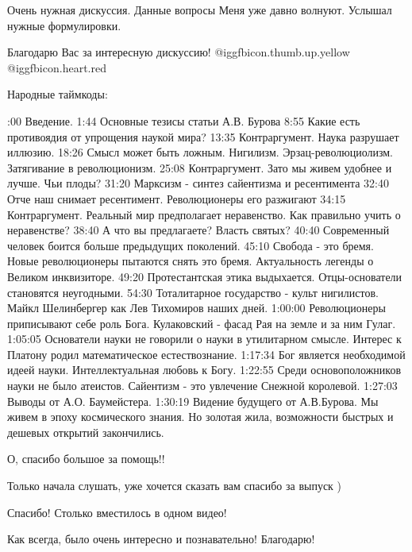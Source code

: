 \begin{multicols}{2} %
\setlength{\parindent}{0pt}


Очень нужная дискуссия.
Данные вопросы Меня уже давно волнуют. Услышал нужные формулировки.

Благодарю Вас  за интересную дискуссию! @igg{fbicon.thumb.up.yellow} @igg{fbicon.heart.red}


Народные таймкоды:

:00 Введение. 
1:44 Основные тезисы статьи А.В. Бурова
8:55 Какие есть противоядия от упрощения наукой мира?
13:35 Контраргумент. Наука разрушает иллюзию.
18:26 Смысл может быть ложным. Нигилизм. Эрзац-революциолизм. Затягивание в революционизм.
25:08 Контраргумент. Зато мы живем удобнее и лучше. Чьи плоды?
31:20 Марксизм - синтез сайентизма и ресентимента
32:40 Отче наш снимает ресентимент. Революционеры его разжигают
34:15 Контраргумент. Реальный мир предполагает неравенство. Как правильно учить о неравенстве?
38:40 А что вы предлагаете? Власть святых? 
40:40 Современный человек боится больше предыдущих поколений.
45:10 Свобода - это бремя. Новые революционеры пытаются снять это бремя. Актуальность легенды о Великом инквизиторе.
49:20 Протестантская этика выдыхается. Отцы-основатели становятся неугодными. 
54:30 Тоталитарное государство - культ нигилистов. Майкл Шелинбергер как Лев Тихомиров наших дней.
1:00:00 Революционеры приписывают себе роль Бога. Кулаковский - фасад Рая на земле и за ним Гулаг. 
1:05:05 Основатели науки не говорили о науки в утилитарном смысле. Интерес к Платону родил математическое естествознание. 
1:17:34 Бог является необходимой идеей науки. Интеллектуальная любовь к Богу. 
1:22:55 Среди основоположников науки не было атеистов. Сайентизм - это увлечение Снежной королевой.
1:27:03 Выводы от А.О. Баумейстера. 
1:30:19 Видение будущего от А.В.Бурова. Мы живем в эпоху космического знания. Но золотая жила, возможности быстрых и дешевых открытий закончились.
\restorecr

О, спасибо большое за помощь!!

Только начала слушать, уже хочется сказать вам спасибо за выпуск )

Спасибо! Столько вместилось в одном видео!

Как всегда, было очень интересно и познавательно! Благодарю!


\end{multicols}
